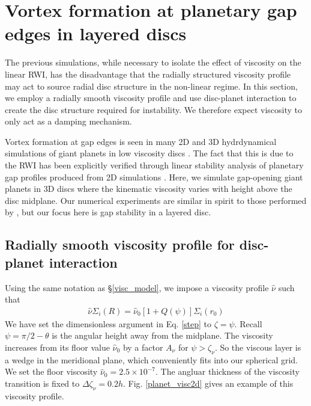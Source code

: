 \section{Vortex formation at planetary gap edges in layered
  discs}\label{disc-planet} 
The previous simulations, while necessary to isolate the effect of 
viscosity on the linear RWI, has the disadvantage that the radially
structured viscosity profile may act to source radial disc structure
in the non-linear regime. In this section, we employ a radially smooth
viscosity profile and use 
disc-planet interaction to
create the disc structure required for instability. We therefore expect viscosity to only
act as a damping mechanism. 

Vortex formation at gap edges is seen in many  
2D and 3D hydrdynamical simulations of giant planets in low viscosity discs 
\citep{valborro07,lin10,lin11a,lin12}. The fact that this is due to
the RWI has been explicitly verified through linear stability
analysis of planetary gap profiles produced from 2D simulations
\citep{valborro07,lin10}. Here, we simulate gap-opening giant planets
in 3D discs where the kinematic viscosity varies with height above the
disc midplane. Our numerical experiments are similar in spirit to
those performed by \cite{pierens10}, but our focus here is gap
stability in a layered disc. 
 
\subsection{Radially smooth viscosity profile for disc-planet
  interaction}\label{planet_visc_mode} 
Using the same notation as \S\ref{visc_model}, we impose a viscosity
profile $\hat{\nu}$ such that 
\begin{align}\label{planet_visc_profile}
  \hat{\nu}\Sigma_i(R)=
  \hat{\nu}_0\left[1+Q(\psi)\right]\Sigma_i(r_0)   
\end{align}
We have set the dimensionless argument in Eq. \ref{step} to
$\zeta=\psi$. Recall $\psi=\pi/2-\theta$ is the angular height away from the midplane. 
The viscosity increases from its floor value $\hat{\nu}_0$ by a factor
$A_\nu$ for $\psi > \zeta_\nu$. So the viscous layer is 
a wedge in the meridional plane, which conveniently fits into our
spherical grid. We set the floor viscosity $\hat{\nu}_0=2.5\times 10^{-7}$. 
The angluar thickness of the viscosity transition is fixed to $\Delta\zeta_\nu =
0.2h$. Fig. \ref{planet_visc2d} gives an example of this 
viscosity profile. %

